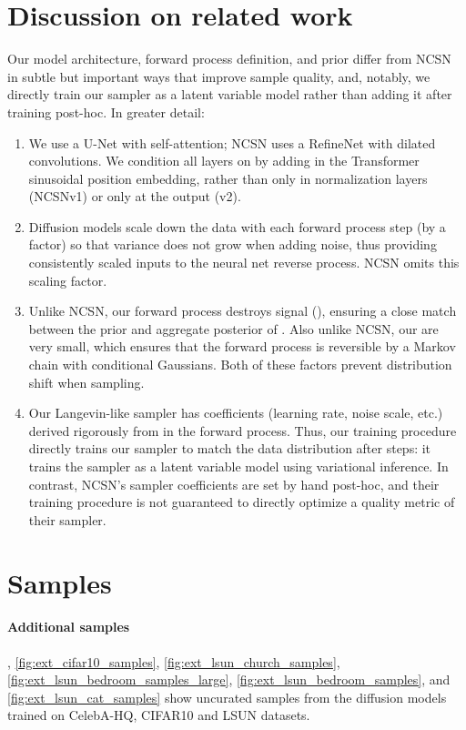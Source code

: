 \documentclass{article}
\begin{document}
\section{Discussion on related work}
\label{sec:extended_related_work}

Our model architecture, forward process definition, and prior differ from NCSN~\citep{song2019generative,song2020improved} in subtle but important ways that improve sample quality, and, notably, we directly train our sampler as a latent variable model rather than adding it after training post-hoc. In greater detail:
\begin{enumerate}
  \item We use a U-Net with self-attention; NCSN uses a RefineNet with dilated convolutions.
We condition all layers on  by adding in the Transformer sinusoidal position embedding, rather than only in normalization layers (NCSNv1) or only at the output (v2).
  \item Diffusion models scale down the data with each forward process step (by a  factor) so that variance does not grow when adding noise, thus providing consistently scaled inputs to the neural net reverse process. NCSN omits this scaling factor.
  \item Unlike NCSN, our forward process destroys signal (), ensuring a close match between the prior and aggregate posterior of .
Also unlike NCSN, our  are very small, which ensures that the forward process is reversible by a Markov chain with conditional Gaussians. Both of these factors prevent distribution shift when sampling.
  \item Our Langevin-like sampler has coefficients  (learning rate, noise scale, etc.)
derived rigorously from  in the forward process. Thus, our training procedure directly trains our sampler to match the data distribution after  steps: it trains the sampler as a latent variable model using variational inference. In contrast, NCSN's sampler coefficients are set by hand post-hoc, and their training procedure is not guaranteed to directly optimize a quality metric of their sampler.
\end{enumerate}

\section{Samples}
\label{sec:extended_samples}
\paragraph{Additional samples} , \ref{fig:ext_cifar10_samples},
\ref{fig:ext_lsun_church_samples},
\ref{fig:ext_lsun_bedroom_samples_large},
\ref{fig:ext_lsun_bedroom_samples},
and \ref{fig:ext_lsun_cat_samples} show uncurated samples from the diffusion models trained on CelebA-HQ, CIFAR10 and LSUN datasets.
\end{document}
